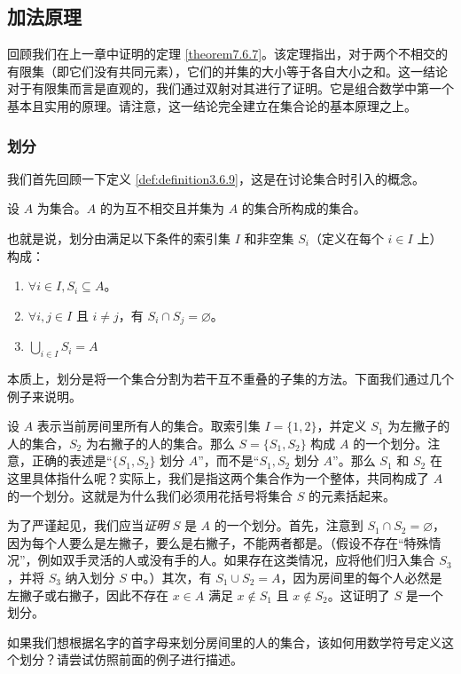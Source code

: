 
\subsection{加法原理}

回顾我们在上一章中证明的定理 \ref{theorem7.6.7}。该定理指出，对于两个不相交的有限集（即它们没有共同元素），它们的并集的大小等于各自大小之和。这一结论对于有限集而言是直观的，我们通过双射对其进行了证明。它是组合数学中第一个基本且实用的原理。请注意，这一结论完全建立在集合论的基本原理之上。

\subsubsection*{划分}

我们首先回顾一下定义 \ref{def:definition3.6.9}，这是在讨论集合时引入的概念。

\begin{definition}
    设 $A$ 为集合。$A$ 的为互不相交且并集为 $A$ 的集合所构成的集合。

    也就是说，划分由满足以下条件的索引集 $I$ 和非空集 $S_i$（定义在每个 $i \in I$ 上）构成：
    \begin{enumerate}[label=(\arabic*)]
        \item $\forall i \in I, S_i \subseteq A$。
        \item $\forall i, j \in I$ 且 $i \ne j$，有 $S_i \cap S_j = \varnothing$。
        \item $\displaystyle \bigcup_{i \in I} S_i = A$
    \end{enumerate}
\end{definition}
本质上，划分是将一个集合分割为若干互不重叠的子集的方法。下面我们通过几个例子来说明。

\begin{example}
    设 $A$ 表示当前房间里所有人的集合。取索引集 $I = \{1, 2\}$，并定义 $S_1$ 为左撇子的人的集合，$S_2$ 为右撇子的人的集合。那么 $S = \{S_1, S_2\}$ 构成 $A$ 的一个划分。注意，正确的表述是``$\{S_1, S_2\}$ 划分 $A$''，而不是``$S_1, S_2$ 划分 $A$''。那么 $S_1$ 和 $S_2$ 在这里具体指什么呢？实际上，我们是指这两个集合作为一个整体，共同构成了 $A$ 的一个划分。这就是为什么我们必须用花括号将集合 $S$ 的元素括起来。

    为了严谨起见，我们应当\emph{证明} $S$ 是 $A$ 的一个划分。首先，注意到 $S_1 \cap S_2 = \varnothing$，因为每个人要么是左撇子，要么是右撇子，不能两者都是。（假设不存在``特殊情况''，例如双手灵活的人或没有手的人。如果存在这类情况，应将他们归入集合 $S_3$，并将 $S_3$ 纳入划分 $S$ 中。）其次，有 $S_1 \cup S_2 = A$，因为房间里的每个人必然是左撇子或右撇子，因此不存在 $x \in A$ 满足 $x \notin S_1$ 且 $x \notin S_2$。这证明了 $S$ 是一个划分。

    如果我们想根据名字的首字母来划分房间里的人的集合，该如何用数学符号定义这个划分？请尝试仿照前面的例子进行描述。
\end{example}

